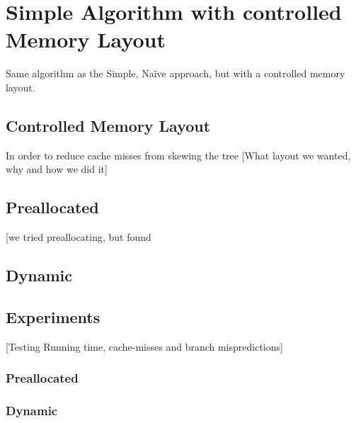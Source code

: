 \section{Simple Algorithm with controlled Memory Layout}
Same algorithm as the Simple, Naïve approach, but with a controlled memory layout.

\subsection{Controlled Memory Layout}
In order to reduce cache misses from skewing the tree 
[What layout we wanted, why and how we did it]

\subsection{Preallocated}
[we tried preallocating, but found 

\subsection{Dynamic}

\subsection{Experiments}
[Testing Running time, cache-misses and branch mispredictions]
\subsubsection{Preallocated}

\subsubsection{Dynamic}




